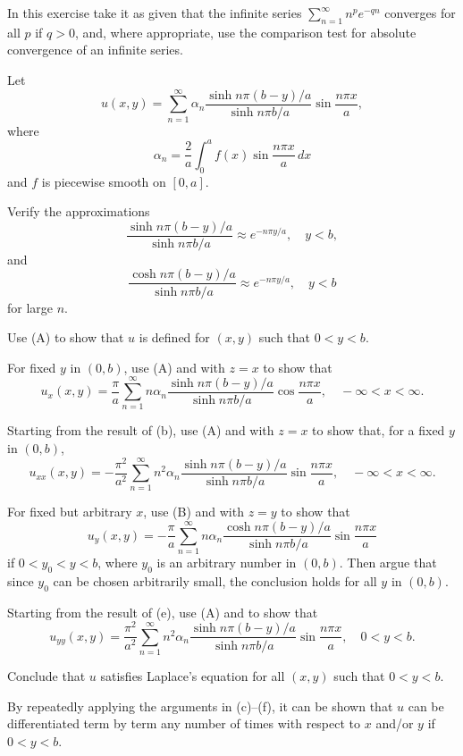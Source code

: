 \begin{exerciselist}
\item\label{exer:12.3.37}In this exercise
take it as given that the infinite series $\sum_{n=1}^\infty
n^pe^{-qn}$ converges for all $p$ if $q>0$, and, where appropriate,
use the comparison test for absolute convergence of an infinite
series.

Let
\[
u(x,y)=\sum_{n=1}^\infty \alpha_n
\frac{\sinh n\pi(b-y)/a}{\sinh n\pi b/a}
\sin\frac{n\pi x}{a},
\]
where
\[
\alpha_n=\frac{2}{a}\int_0^a f(x)\sin\frac{n\pi x}{a}\,dx
\]
and $f$ is piecewise smooth on $[0,a]$.



\begin{alist}
\item %
Verify the approximations
\[
\frac{\sinh n\pi(b-y)/a}{\sinh n\pi b/a}\approx e^{-n\pi y/a},\quad y<b,
\tag{A}
\]
and
\[
\frac{\cosh n\pi(b-y)/a}{\sinh n\pi b/a}\approx e^{-n\pi y/a},\quad y<b
\tag{B}
\]
for large $n$.
\item %
Use (A) to show that
 $u$ is defined for $(x,y)$ such that $0<y<b$.
\item %
For fixed $y$ in $(0,b)$,
use (A) and  with $z=x$
 to show that
\[
u_x(x,y)=\frac{\pi}{a}\sum_{n=1}^\infty n\alpha_n
\frac{\sinh n\pi(b-y)/a}{\sinh n\pi b/a}
\cos\frac{n\pi x}{a},\quad -\infty<x< \infty.
\]
\item %
Starting from the result of (b),
use (A) and  with $z=x$
 to show that, for a fixed $y$ in $(0,b)$,
\[
u_{xx}(x,y)=-\frac{\pi^2}{a^2}\sum_{n=1}^\infty n^2\alpha_n
\frac{\sinh n\pi(b-y)/a}{\sinh n\pi b/a}
\sin\frac{n\pi x}{a},\quad -\infty<x< \infty.
\]
\item %
For fixed but arbitrary $x$,
use (B) and  with $z=y$
 to show that
\[
u_y(x,y)=-\frac{\pi}{a}\sum_{n=1}^\infty n\alpha_n
\frac{\cosh n\pi(b-y)/a}{\sinh n\pi b/a}
\sin\frac{n\pi x}{a}
\]
if $0<y_0<y<b$, where $y_0$ is an  arbitrary
number in $(0,b)$.
 Then argue that since $y_0$ can be chosen arbitrarily small,
the conclusion holds for all $y$ in $(0,b)$.
\item %
Starting from the result of (e), use (A) and
 to show that
\[
u_{yy}(x,y)=\frac{\pi^2}{a^2}\sum_{n=1}^\infty n^2\alpha_n
\frac{\sinh n\pi(b-y)/a}{\sinh n\pi b/a}
\sin\frac{n\pi x}{a},\quad 0<y<b.
\]
\item %
Conclude that $u$ satisfies Laplace's equation for all $(x,y)$
such that $0<y<b$.
\end{alist}

By repeatedly applying the arguments in (c)--(f),
it can be shown that $u$ can be differentiated term by term any
number of times with respect to $x$ and/or $y$ if $0<y<b$.

\end{exerciselist}


